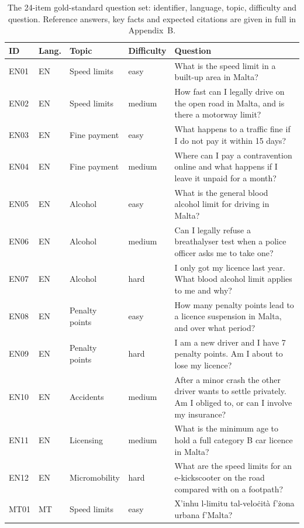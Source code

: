 \begin{table}[tbp]
\centering
\caption{The 24-item gold-standard question set: identifier, language, topic, difficulty and question. Reference answers, key facts and expected citations are given in full in Appendix~B.}
\label{tab:gold-questions}
{\footnotesize{}
\def\arraystretch{1.15}
\begin{tabularx}{\textwidth}{@{}l l l l >{\raggedright\arraybackslash}X@{}}
\toprule
\textbf{ID} & \textbf{Lang.} & \textbf{Topic} & \textbf{Difficulty} & \textbf{Question} \\
\midrule
EN01 & EN & Speed limits & easy & What is the speed limit in a built-up area in Malta? \\
EN02 & EN & Speed limits & medium & How fast can I legally drive on the open road in Malta, and is there a motorway limit? \\
EN03 & EN & Fine payment & easy & What happens to a traffic fine if I do not pay it within 15 days? \\
EN04 & EN & Fine payment & medium & Where can I pay a contravention online and what happens if I leave it unpaid for a month? \\
EN05 & EN & Alcohol & easy & What is the general blood alcohol limit for driving in Malta? \\
EN06 & EN & Alcohol & medium & Can I legally refuse a breathalyser test when a police officer asks me to take one? \\
EN07 & EN & Alcohol & hard & I only got my licence last year. What blood alcohol limit applies to me and why? \\
EN08 & EN & Penalty points & easy & How many penalty points lead to a licence suspension in Malta, and over what period? \\
EN09 & EN & Penalty points & hard & I am a new driver and I have 7 penalty points. Am I about to lose my licence? \\
EN10 & EN & Accidents & medium & After a minor crash the other driver wants to settle privately. Am I obliged to, or can I involve my insurance? \\
EN11 & EN & Licensing & medium & What is the minimum age to hold a full category B car licence in Malta? \\
EN12 & EN & Micromobility & hard & What are the speed limits for an e-kickscooter on the road compared with on a footpath? \\
MT01 & MT & Speed limits & easy & X'inhu l-limitu tal-veloċità f'żona urbana f'Malta? \\

\end{tabularx}}
\end{table}
